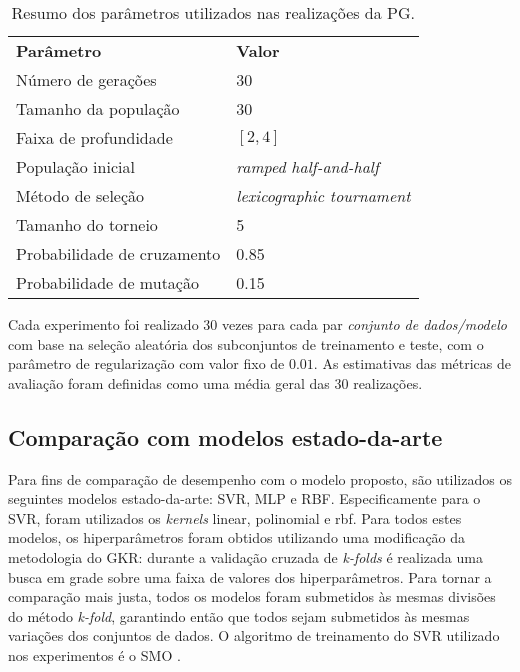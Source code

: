 \begin{table}[H]
    \caption{Resumo dos parâmetros utilizados nas realizações da PG.}
    \label{tab:pg-params}
    \begin{center}
        \begin{tabular}{l@{\hskip 18pt}l}
            \hline\noalign{\smallskip}
            \textbf{Parâmetro} & \textbf{Valor}\\
            \noalign{\smallskip}
            \hline
            \noalign{\smallskip}
            Número de gerações & 30 \\
            Tamanho da população & 30 \\
            Faixa de profundidade & $[2, 4]$ \\
            População inicial & \textit{ramped half-and-half} \\
            Método de seleção & \textit{lexicographic tournament} \\
            Tamanho do torneio & 5 \\
            Probabilidade de cruzamento & 0.85 \\
            Probabilidade de mutação & 0.15 \\
            \hline
        \end{tabular}
    \end{center}
    \begin{center}
    \end{center}
\end{table}

\vspace*{-0.7cm}

Cada experimento foi realizado 30 vezes para cada par \textit{conjunto de dados/modelo} com base na seleção aleatória dos subconjuntos de treinamento e teste, com o parâmetro de regularização com valor fixo de $0.01$. As estimativas das métricas de avaliação foram definidas como uma média geral das 30 realizações.

\subsection{Comparação com modelos estado-da-arte}
Para fins de comparação de desempenho com o modelo proposto, são utilizados os seguintes modelos estado-da-arte: SVR, MLP e RBF. Especificamente para o SVR, foram utilizados os \textit{kernels} linear, polinomial e rbf. Para todos estes modelos, os hiperparâmetros foram obtidos utilizando uma modificação da metodologia do GKR: durante a validação cruzada de \textit{k-folds} é realizada uma busca em grade sobre uma faixa de valores dos hiperparâmetros. Para tornar a comparação mais justa, todos os modelos foram submetidos às mesmas divisões do método \textit{k-fold}, garantindo então que todos sejam submetidos às mesmas variações dos conjuntos de dados. O algoritmo de treinamento do SVR utilizado nos experimentos é o SMO \cite{platt1999}.

